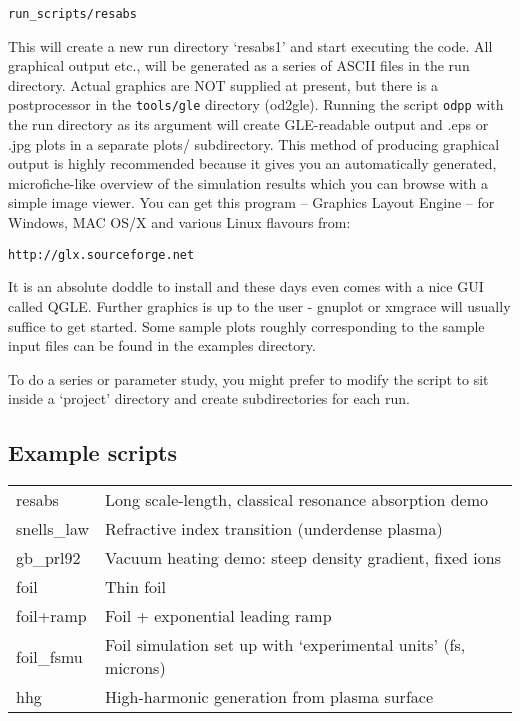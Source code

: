 \documentclass[11pt]{article}
\begin{document}
\begin{verbatim}
run_scripts/resabs
\end{verbatim}	
	
This will create a new run directory `resabs1' and start executing the code.
All graphical output etc., will be generated as a series of ASCII files
in the run directory.  Actual graphics are NOT supplied at present,
but there is a postprocessor in the \texttt{tools/gle} directory (od2gle). 
Running the script \texttt{odpp} with the run directory as its argument will create GLE-readable output and .eps or .jpg plots in a separate plots/ subdirectory.
This method of producing graphical output is highly recommended because it gives you an automatically generated, microfiche-like overview
 of the simulation results which you can browse with a simple image viewer.  You can get this program -- Graphics Layout Engine -- for Windows, MAC OS/X and various Linux flavours from:

\begin{verbatim}
http://glx.sourceforge.net
\end{verbatim}
%
It is an absolute doddle to install and these days even comes with a nice GUI called QGLE.  Further graphics is up to the user - gnuplot or xmgrace will usually 
suffice to get started.  
Some sample plots roughly corresponding to the sample input 
files can be found in the examples directory.

To do a series or parameter study, you might prefer to modify the
script to sit inside a `project' directory and create subdirectories for 
each run.

\subsection{Example scripts}\label{scripts}

\begin{tabular}{ll}
resabs	&	Long scale-length, classical resonance absorption demo\\
snells\_law &	Refractive index transition (underdense plasma)\\
gb\_prl92 &	Vacuum heating demo: steep density gradient, fixed ions\\
foil	&	Thin foil\\
foil+ramp &	Foil + exponential leading ramp\\
foil\_fsmu & 	Foil simulation set up with `experimental units' (fs, microns)\\
hhg	&	High-harmonic generation from plasma surface
\end{tabular}	
\end{document}
